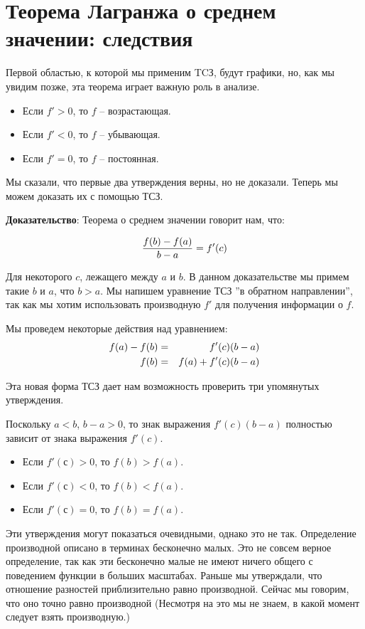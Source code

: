 \documentclass[a4paper,12pt]{article}
\begin{document}
\section{Теорема Лагранжа о среднем значении: следствия}

Первой областью, к которой мы применим TCЗ, будут графики, но, как мы увидим позже, эта теорема играет важную роль в анализе.

\begin{itemize}
	\item Если $f' > 0$, то $f$ -- возрастающая.
	\item Если $f' < 0$, то $f$ -- убывающая.
	\item Если $f' = 0$, то $f$ -- постоянная.
\end{itemize}

Мы сказали, что первые два утверждения верны, но не доказали. Теперь мы можем доказать их с помощью ТСЗ.

\textbf{Доказательство}: Теорема о среднем значении говорит нам, что:

\[
	\frac{f(b) - f(a)}{b-a} = f'(c) \notag
\]

Для некоторого $c$, лежащего между $a$ и $b$. В данном доказательстве мы примем такие $b$ и $a$, что $b > a$.
Мы напишем уравнение ТСЗ ''в обратном направлении'', так как мы хотим использовать производную $f'$ для получения информации о $f$.

Мы проведем некоторые действия над уравнением:
\begin{eqnarray}
f(a) - f(b) &=& f'(c)(b-a) \notag \\
f(b) &=& f(a)+f'(c)(b-a) \notag
\end{eqnarray}

Эта новая форма ТСЗ дает нам возможность проверить три упомянутых утверждения.

Поскольку $a<b$, $b-a>0$, то знак выражения $f'(c)(b-a)$ полностью зависит от знака выражения $f'(c)$.
\begin{itemize}
	\item Если $f'(с) > 0$, то $f(b) > f(a)$.
	\item Если $f'(с) < 0$, то $f(b) < f(a)$.
	\item Если $f'(с) = 0$, то $f(b) = f(a)$.
\end{itemize}

Эти утверждения могут показаться очевидными, однако это не так. Определение производной описано в терминах бесконечно малых. Это не совсем верное определение, так как эти бесконечно малые не имеют ничего общего с поведением функции в больших масштабах. Раньше мы утверждали, что отношение разностей приблизительно равно производной. Сейчас мы говорим, что оно точно равно производной (Несмотря на это мы не знаем, в какой момент следует взять производную.)
\end{document}
